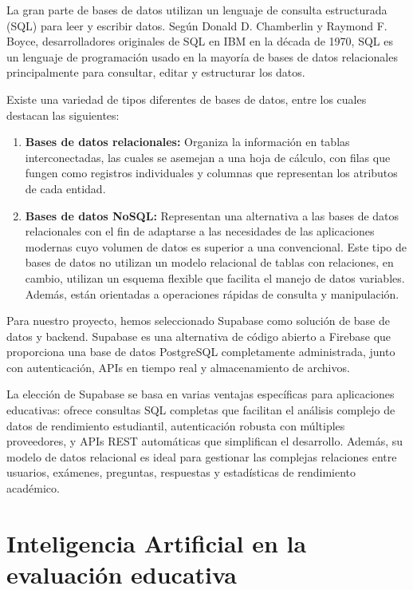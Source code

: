 \documentclass[12pt,a4paper]{report}
\begin{document}
La gran parte de bases de datos utilizan un lenguaje de consulta estructurada (SQL) para leer y escribir datos. Según Donald D. Chamberlin y Raymond F. Boyce, desarrolladores originales de SQL en IBM en la década de 1970, SQL es un lenguaje de programación usado en la mayoría de bases de datos relacionales principalmente para consultar, editar y estructurar los datos.

Existe una variedad de tipos diferentes de bases de datos, entre los cuales destacan las siguientes:

\begin{enumerate}
\item \textbf{Bases de datos relacionales:} Organiza la información en tablas interconectadas, las cuales se asemejan a una hoja de cálculo, con filas que fungen como registros individuales y columnas que representan los atributos de cada entidad.

\item \textbf{Bases de datos NoSQL:} Representan una alternativa a las bases de datos relacionales con el fin de adaptarse a las necesidades de las aplicaciones modernas cuyo volumen de datos es superior a una convencional. Este tipo de bases de datos no utilizan un modelo relacional de tablas con relaciones, en cambio, utilizan un esquema flexible que facilita el manejo de datos variables. Además, están orientadas a operaciones rápidas de consulta y manipulación.
\end{enumerate}

Para nuestro proyecto, hemos seleccionado Supabase como solución de base de datos y backend. Supabase es una alternativa de código abierto a Firebase que proporciona una base de datos PostgreSQL completamente administrada, junto con autenticación, APIs en tiempo real y almacenamiento de archivos.

La elección de Supabase se basa en varias ventajas específicas para aplicaciones educativas: ofrece consultas SQL completas que facilitan el análisis complejo de datos de rendimiento estudiantil, autenticación robusta con múltiples proveedores, y APIs REST automáticas que simplifican el desarrollo. Además, su modelo de datos relacional es ideal para gestionar las complejas relaciones entre usuarios, exámenes, preguntas, respuestas y estadísticas de rendimiento académico.

\section{Inteligencia Artificial en la evaluación educativa}
\end{document}
